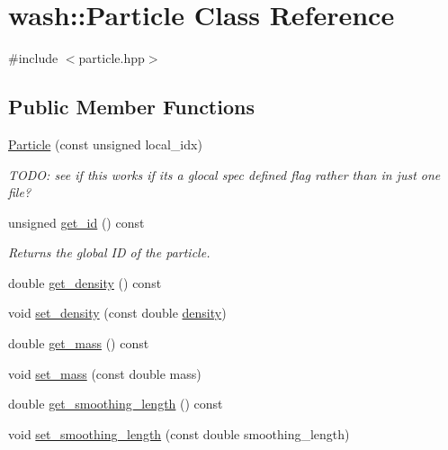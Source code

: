 \hypertarget{classwash_1_1Particle}{}\section{wash\+:\+:Particle Class Reference}
\label{classwash_1_1Particle}


{\ttfamily \#include $<$particle.\+hpp$>$}

\subsection*{Public Member Functions}
\begin{DoxyCompactItemize}
\item 
\mbox{\hyperlink{classwash_1_1Particle_a72131cdf3fdbcada383d81604fd49503}{Particle}} (const unsigned local\+\_\+idx)
\begin{DoxyCompactList}\small\item\em T\+O\+DO\+: see if this works if it\textquotesingle{}s a glocal spec defined flag rather than in just one file? \end{DoxyCompactList}\item 
unsigned \mbox{\hyperlink{classwash_1_1Particle_aef9f2814cc392598de7756e1046fea67}{get\+\_\+id}} () const
\begin{DoxyCompactList}\small\item\em Returns the global ID of the particle. \end{DoxyCompactList}\item 
double \mbox{\hyperlink{classwash_1_1Particle_a8c0ce3f48b189fd8550c3bfab17eec68}{get\+\_\+density}} () const
\item 
void \mbox{\hyperlink{classwash_1_1Particle_a6416678dd509c16c2933d315b6ae6156}{set\+\_\+density}} (const double \mbox{\hyperlink{3d__fluid__sim_2fluid__sim_8cpp_a140d94d7edb97c062961056d1926a2db}{density}})
\item 
double \mbox{\hyperlink{classwash_1_1Particle_a7d8d11b3e4855e66e62ee58b4270cdc1}{get\+\_\+mass}} () const
\item 
void \mbox{\hyperlink{classwash_1_1Particle_a9151ed34c880f63f062381076834223e}{set\+\_\+mass}} (const double mass)
\item 
double \mbox{\hyperlink{classwash_1_1Particle_aab02f56502c6521382cf7a7320abc341}{get\+\_\+smoothing\+\_\+length}} () const
\item 
void \mbox{\hyperlink{classwash_1_1Particle_a15892a4346c05de955f91087dc88786d}{set\+\_\+smoothing\+\_\+length}} (const double smoothing\+\_\+length)

\end{DoxyCompactItemize}
